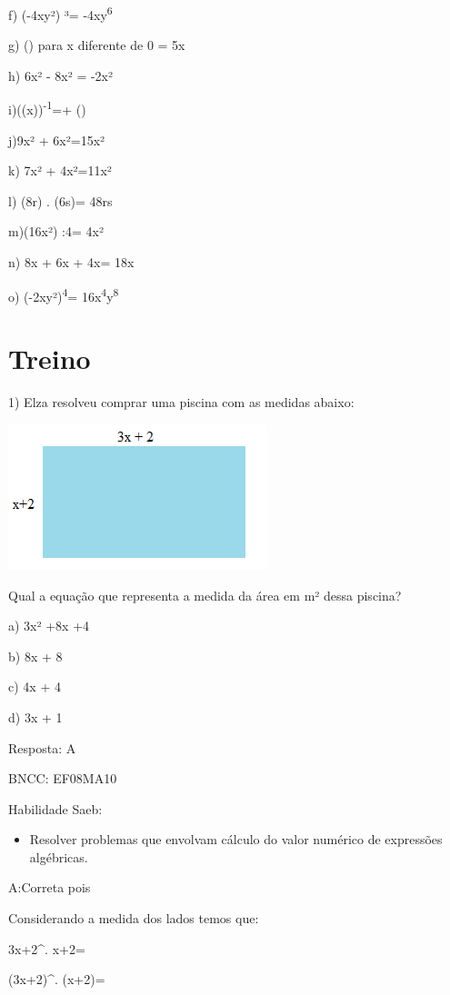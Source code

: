 f) (-4xy²) ³= -4xy\textsuperscript{6}

g) () para x diferente de 0 = 5x

h) 6x² - 8x² = -2x²

i)((x))\textsuperscript{-1}=+ ()

j)9x² + 6x²=15x²

k) 7x² + 4x²=11x²

l) (8r) . (6s)= 48rs

m)(16x²) :4= 4x²

n) 8x + 6x + 4x= 18x

o) (-2xy²)\textsuperscript{4}=
16x\textsuperscript{4}y\textsuperscript{8}

\section{Treino}

1) Elza resolveu comprar uma piscina com as medidas abaixo:

\includegraphics[width=2.9625in,height=1.67014in]{./imgSAEB_8_MAT/media/image6.png}

Qual a equação que representa a medida da área em m² dessa piscina?

a) 3x² +8x +4

b) 8x + 8

c) 4x + 4

d) 3x + 1

Resposta: A

BNCC: EF08MA10

Habilidade Saeb:

\begin{itemize}
\tightlist
\item
  Resolver problemas que envolvam cálculo do valor numérico de
  expressões algébricas.
\end{itemize}

A:Correta pois

Considerando a medida dos lados temos que:

3x+2^{.} x+2=

(3x+2)^{.} (x+2)=

